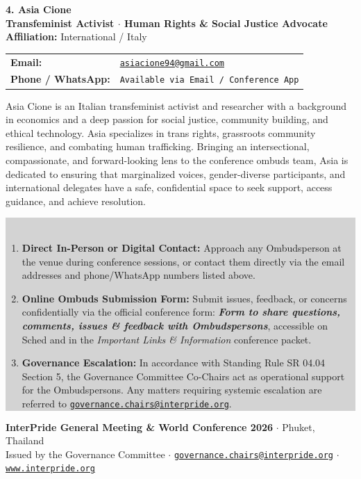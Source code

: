 \documentclass[10pt,a4paper]{article}
\makeatletter
\newcommand{\ombudsperson}[6]{
    \noindent
    \begin{minipage}{\linewidth}
        \vspace{2mm}
        {\Large\bfseries\color{primary} #1}\\[1mm]
        {\normalsize\bfseries\color{secondary} #2} \hfill {\footnotesize\textbf{Affiliation:} #3}\\[1.5mm]
        \begin{tabularx}{\linewidth}{@{}lX@{}}
            \textbf{\footnotesize Email:} & \href{mailto:#4}{\small\texttt{#4}} \\
            \textbf{\footnotesize Phone / WhatsApp:} & \small\texttt{#5} \\
        \end{tabularx}
        \vspace{1.5mm}
        
        \noindent\small #6
        \vspace{3mm}
        \noindent{\color{bordergray}\hrule height 0.6pt}
    \end{minipage}
}
\makeatother
\begin{document}
\ombudsperson{4. Asia Cione}%
{Transfeminist Activist $\cdot$ Human Rights \& Social Justice Advocate}%
{International / Italy}%
{asiacione94@gmail.com}%
{Available via Email / Conference App}%
{Asia Cione is an Italian transfeminist activist and researcher with a background in economics and a deep passion for social justice, community building, and ethical technology. Asia specializes in trans rights, grassroots community resilience, and combating human trafficking. Bringing an intersectional, compassionate, and forward-looking lens to the conference ombuds team, Asia is dedicated to ensuring that marginalized voices, gender-diverse participants, and international delegates have a safe, confidential space to seek support, access guidance, and achieve resolution.}

\vspace{5mm}

\noindent
\colorbox{lightgray}{%
\parbox{\dimexpr\linewidth-2\fboxsep\relax}{%
    \vspace{2mm}
    \\[1.5mm]
    \small
    \begin{enumerate}
        \item \textbf{Direct In-Person or Digital Contact:} Approach any Ombudsperson at the venue during conference sessions, or contact them directly via the email addresses and phone/WhatsApp numbers listed above.
        \item \textbf{Online Ombuds Submission Form:} Submit issues, feedback, or concerns confidentially via the official conference form: \textbf{\textit{Form to share questions, comments, issues \& feedback with Ombudspersons}}, accessible on Sched and in the \textit{Important Links \& Information} conference packet.
        \item \textbf{Governance Escalation:} In accordance with Standing Rule SR 04.04 Section 5, the Governance Committee Co-Chairs act as operational support for the Ombudspersons. Any matters requiring systemic escalation are referred to \href{mailto:governance.chairs@interpride.org}{\texttt{governance.chairs@interpride.org}}.
    \end{enumerate}
    \vspace{1mm}
}}

\vfill

\begin{center}
    \footnotesize\color{muted}
    \textbf{InterPride General Meeting \& World Conference 2026} $\cdot$ Phuket, Thailand\\
    Issued by the Governance Committee $\cdot$ \href{mailto:governance.chairs@interpride.org}{\texttt{governance.chairs@interpride.org}} $\cdot$ \href{https://www.interpride.org}{\texttt{www.interpride.org}}
\end{center}
\end{document}
